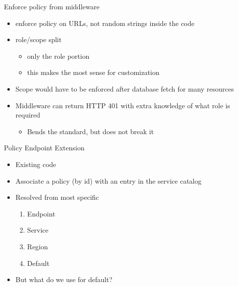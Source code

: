 \documentclass{beamer}
\begin{document}
\begin{frame}{Enforce policy from middleware}
  \begin{itemize}
  \item enforce policy on URLs, not random strings inside the code
  \item role/scope split
    \begin{itemize}
    \item only the role portion
    \item this makes the most sense for customization
    \end{itemize}
  \item Scope would have to be enforced after database fetch for many resources
  \item Middleware can return HTTP 401 with extra knowledge of what role is required
    \begin{itemize}
    \item Bends the standard, but does not break it
    \end{itemize}
  \end{itemize}
\end{frame}


\begin{frame}{Policy Endpoint Extension}
  
  \begin{itemize}
  \item Existing code
  \item Associate a policy (by id) with an entry in the service catalog
  \item Resolved from most specific
    \begin{enumerate}
    \item Endpoint
    \item Service
    \item Region
    \item Default
    \end{enumerate}
  \item But what do we use for default?
  \end{itemize}
\end{frame}
\end{document}
